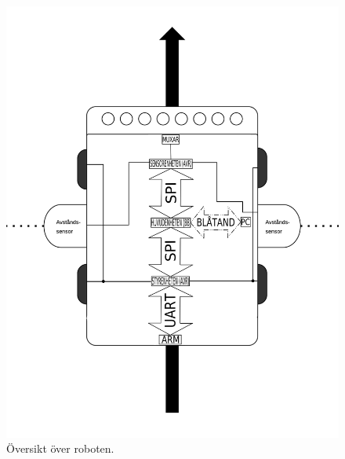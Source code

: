\begin{figure}[h!]
\center
\includegraphics[scale=0.32]{robot}
\caption{Översikt över roboten.} \label{designspec:robot}
\end{figure}